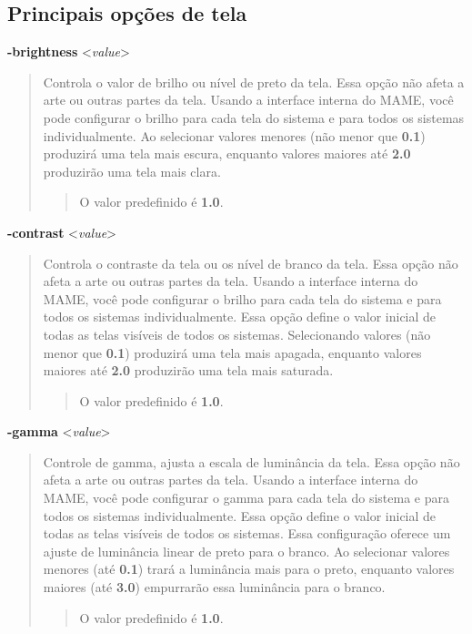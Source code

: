 \documentclass[letterpaper,10pt,brazil]{sphinxmanual}
\begin{document}
\subsection{Principais opções de tela}
\label{commandline/commandline-all:principais-opcoes-de-tela}\label{commandline/commandline-all:mame-commandline-brightness}
\textbf{-brightness} \textless{}\emph{value}\textgreater{}
\begin{quote}

Controla o valor de brilho ou nível de preto da tela.
Essa opção não afeta a arte ou outras partes da tela. Usando a
interface interna do MAME, você pode configurar o brilho para cada
tela do sistema e para todos os sistemas individualmente.
Ao selecionar valores menores (não menor que \textbf{0.1}) produzirá uma
tela mais escura, enquanto valores maiores até \textbf{2.0} produzirão
uma tela mais clara.
\begin{quote}

O valor predefinido é \textbf{1.0}.
\end{quote}
\end{quote}
\label{commandline/commandline-all:mame-commandline-contrast}
\textbf{-contrast} \textless{}\emph{value}\textgreater{}
\begin{quote}

Controla o contraste da tela ou os nível de branco da tela.
Essa opção não afeta a arte ou outras partes da tela. Usando a
interface interna do MAME, você pode configurar o brilho para cada
tela do sistema e para todos os sistemas individualmente.
Essa opção define o valor inicial de todas as telas visíveis de
todos os sistemas.
Selecionando valores (não menor que \textbf{0.1}) produzirá uma tela mais
apagada, enquanto valores maiores até \textbf{2.0} produzirão uma tela
mais saturada.
\begin{quote}

O valor predefinido é \textbf{1.0}.
\end{quote}
\end{quote}
\label{commandline/commandline-all:mame-commandline-gamma}
\textbf{-gamma} \textless{}\emph{value}\textgreater{}
\begin{quote}

Controle de gamma, ajusta a escala de luminância da tela. Essa opção
não afeta a arte ou outras partes da tela. Usando a interface
interna do MAME, você pode configurar o gamma para cada tela do
sistema e para todos os sistemas individualmente. Essa opção define
o valor inicial de todas as telas visíveis de todos os sistemas.
Essa configuração oferece um ajuste de luminância linear de preto
para o branco. Ao selecionar valores menores (até \textbf{0.1})
trará a luminância mais para o preto, enquanto valores maiores
(até \textbf{3.0}) empurrarão essa luminância para o branco.
\begin{quote}

O valor predefinido é \textbf{1.0}.
\end{quote}
\end{quote}
\end{document}
